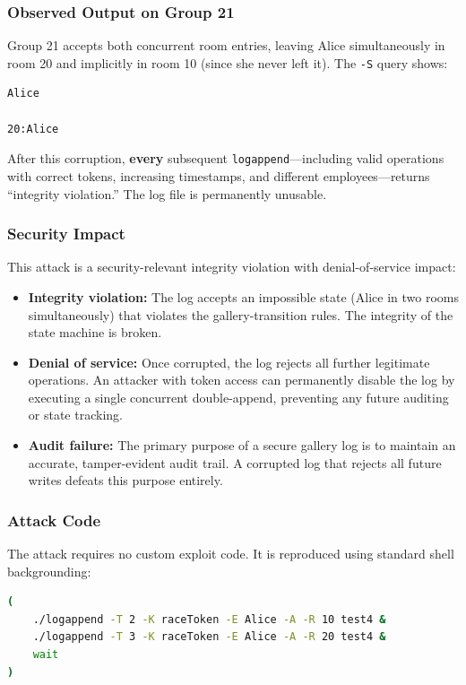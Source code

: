 \documentclass[a4paper, 12pt]{article}
\begin{document}
    \subsubsection{Observed Output on Group 21}
    Group 21 accepts both concurrent room entries, leaving Alice simultaneously in room 20 and implicitly in room 10 (since she never left it). The \texttt{-S} query shows:
    \begin{lstlisting}
Alice

20:Alice
    \end{lstlisting}
    After this corruption, \textbf{every} subsequent \texttt{logappend}---including valid operations with correct tokens, increasing timestamps, and different employees---returns ``integrity violation.'' The log file is permanently unusable.

    \subsubsection{Security Impact}
    This attack is a security-relevant integrity violation with denial-of-service impact:
    \begin{itemize}
        \item \textbf{Integrity violation:} The log accepts an impossible state (Alice in two rooms simultaneously) that violates the gallery-transition rules. The integrity of the state machine is broken.
        \item \textbf{Denial of service:} Once corrupted, the log rejects all further legitimate operations. An attacker with token access can permanently disable the log by executing a single concurrent double-append, preventing any future auditing or state tracking.
        \item \textbf{Audit failure:} The primary purpose of a secure gallery log is to maintain an accurate, tamper-evident audit trail. A corrupted log that rejects all future writes defeats this purpose entirely.
    \end{itemize}

    \subsubsection{Attack Code}
    The attack requires no custom exploit code. It is reproduced using standard shell backgrounding:
    \begin{lstlisting}[language=bash]
(
    ./logappend -T 2 -K raceToken -E Alice -A -R 10 test4 &
    ./logappend -T 3 -K raceToken -E Alice -A -R 20 test4 &
    wait
)
    \end{lstlisting}
\end{document}
